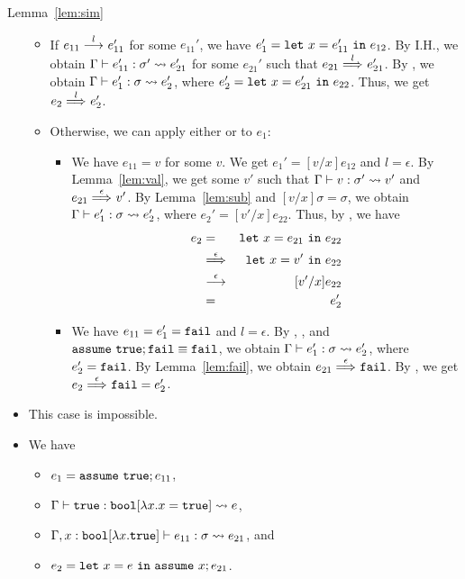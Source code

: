 \begin{pfof}{Lemma~\ref{lem:sim}}
\begin{itemize}
\begin{itemize}
\item If \(e_{11} \stackrel{l}{\longrightarrow}_{} e_{11}'\) for some \(e_{11}'\),
we have \(e_1'=\mathtt{let~}x=e_{11}'\mathtt{~in~}{e_{12}}\).
By I.H., we obtain
\(\Gamma \vdash e_{11}' : \sigma' \leadsto e_{21}'\) for some \(e_{21}'\) such that
\(e_{21} \stackrel{l}{\Longrightarrow}_{} e_{21}'\).
By , we obtain
\(\Gamma \vdash e_1' : \sigma \leadsto e_2'\), where
\(e_2'=\mathtt{let~}x=e_{21}'\mathtt{~in~}{e_{22}}\).
Thus, we get \(e_2 \stackrel{l}{\Longrightarrow}_{} e_2'\).
\item Otherwise, we can apply either  or  to \(e_1\):
\begin{itemize}
\item[\rn{E-Let}]
We have \(e_{11}=v\) for some \(v\).
We get \(e_1'=[v/x]e_{12}\) and \(l=\epsilon\).
By Lemma~\ref{lem:val}, we get some \(v'\) such that
\(\Gamma \vdash v : \sigma' \leadsto v'\) and
\(e_{21} \stackrel{\epsilon}{\Longrightarrow}_{} v'\).
%
By Lemma~\ref{lem:sub} and \([v/x]\sigma=\sigma\), we obtain
\(\Gamma \vdash e_1' : \sigma \leadsto e_2'\), where
\(e_2'=[v'/x]e_{22}\).
Thus, by , we have
\begin{eqnarray*}
e_2&=&\mathtt{let~}x=e_{21}\mathtt{~in~}e_{22} \\
&\stackrel{\epsilon}{\Longrightarrow}_{}& \mathtt{let~}x=v'\mathtt{~in~}e_{22} \\
&\stackrel{\epsilon}{\longrightarrow}_{}& [v'/x]e_{22} \\
&=& e_2'
\end{eqnarray*}
\item[\rn{E-Fail}]
We have \(e_{11}=e_1'=\mathtt{fail}\) and \(l=\epsilon\).
By , , and \(\mathtt{assume~}\mathtt{true}; \mathtt{fail} \equiv \mathtt{fail}\), we obtain
\(\Gamma \vdash e_1' : \sigma \leadsto e_2'\), where
\(e_2'=\mathtt{fail}\).
%
By Lemma~\ref{lem:fail}, we obtain
\(e_{21} \stackrel{\epsilon}{\Longrightarrow}_{} \mathtt{fail}\).
%
By , we get
\(e_2 \stackrel{\epsilon}{\Longrightarrow}_{} \mathtt{fail}=e_2'\).
\end{itemize}
\end{itemize}

\item[]  This case is impossible.

\item[] 
We have
\begin{itemize}
\item \(e_1=\mathtt{assume~}\mathtt{true}; e_{11}\),
\item \(\Gamma \vdash \mathtt{true} : \mathtt{bool}[\lambda x.x=\mathtt{true}] \leadsto e\),
\item \(\Gamma,x:\mathtt{bool}[\lambda x.\mathtt{true}] \vdash e_{11} : \sigma \leadsto e_{21}\), and
\item \(e_2=\mathtt{let~}x=e\mathtt{~in~}{\mathtt{assume~}x; e_{21}}\).
\end{itemize}


\end{itemize}
\end{pfof}

